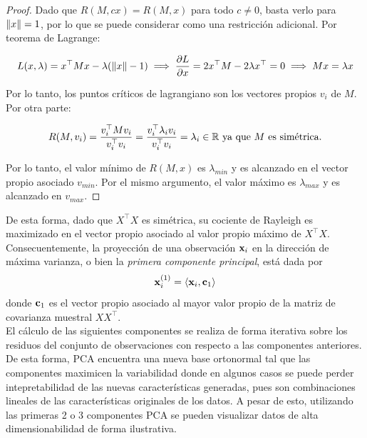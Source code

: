 \begin{proof}
	Dado que $R(M,cx)=R(M,x)$ para todo $c\neq 0$, basta verlo para $\left\lVert x\right\rVert=1$, por lo que se puede considerar como una restricción adicional. Por teorema de Lagrange:
	
	\begin{equation}
		L(x,\lambda) = x^\top Mx - \lambda(\left\lVert x\right\rVert - 1)\implies \frac{\partial L}{\partial x} = 2x^\top M - 2\lambda x^\top = 0 \implies Mx=\lambda x
	\end{equation}
	
	Por lo tanto, los puntos críticos de lagrangiano son los vectores propios $v_i$ de $M$. Por otra parte:
	
	\begin{equation}
		R(M,v_i)=\frac{v_i^\top Mv_i}{v_i^\top v_i} = \frac{v_i^\top \lambda_i v_i}{v_i^\top v_i} = \lambda_i\in\mathbb{R} \text{ ya que $M$ es simétrica.}
	\end{equation}
	
Por lo tanto, el valor mínimo de $R(M,x)$ es $\lambda_{min}$ y es alcanzado en el vector propio asociado $v_{min}$. Por el mismo argumento, el valor máximo es $\lambda_{max}$ y es alcanzado en $v_{max}$.
\end{proof}

De esta forma, dado que $X^\top X$ es simétrica, su cociente de Rayleigh es maximizado en el vector propio asociado al valor propio máximo de $X^\top X$. Consecuentemente, la proyección de una observación $\mathbf{x}_i$ en la dirección de máxima varianza, o bien la \emph{primera componente principal}, está dada por 
\begin{equation}
	\mathbf{x}_i^{(1)} = \langle \mathbf{x}_i, \mathbf{c}_1 \rangle
\end{equation}
donde $\mathbf{c}_1$ es el vector propio asociado al mayor valor propio de la matriz de covarianza muestral $XX^\top$.\\

El cálculo de las siguientes componentes se realiza de forma iterativa sobre los residuos del conjunto de observaciones con respecto a las componentes anteriores. De esta forma, PCA encuentra una nueva base ortonormal tal que las componentes maximicen la variabilidad donde en algunos casos se puede perder intepretabilidad de las nuevas características generadas, pues son combinaciones lineales de las características originales de los datos. A pesar de esto, utilizando las primeras 2 o 3 componentes PCA se pueden visualizar datos de alta dimensionabilidad de forma ilustrativa.


